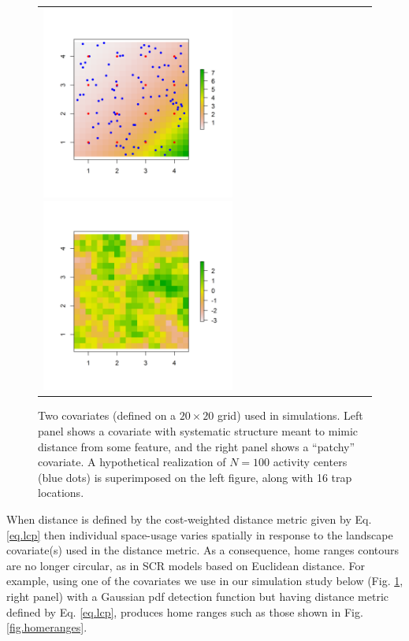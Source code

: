\begin{figure}[h]
\begin{tabular}{ll}
\includegraphics[height=2.5in,width=2.5in]{Ch10-EcolDist/figs/raster_withN100}
\includegraphics[height=2.5in,width=2.5in]{Ch10-EcolDist/figs/raster_krige} &
\end{tabular}
\caption{Two covariates (defined on a $20 \times 20$ grid) used in simulations.
 Left panel shows a 
 covariate with systematic structure meant 
to mimic distance from some feature, and the right panel
 shows a ``patchy'' covariate. 
A hypothetical
  realization of $N=100$ activity centers (blue dots) is superimposed
  on the left figure,
along with 16 trap locations. }
\label{ecoldist.fig.raster100}
\end{figure}


When distance is defined by the cost-weighted distance metric given
by Eq. \ref{eq.lcp} then individual space-usage varies
spatially in response to the landscape covariate(s) used in the
distance metric.  As a consequence, home ranges contours are no longer
circular, as in SCR models based on Euclidean distance.
 For example, using one of the covariates we use in
our simulation study below (Fig. \ref{ecoldist.fig.raster100}, right
panel) with a Gaussian pdf detection function but having distance
metric defined by Eq. \ref{eq.lcp}, produces home ranges such
as those shown in Fig. \ref{fig.homeranges}. 


